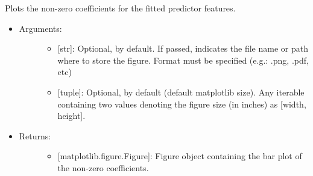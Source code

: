 \documentclass[letterpaper,10pt,english]{sphinxmanual}
\begin{document}
\begin{fulllineitems}

\begin{fulllineitems}
\label{\detokenize{models:data_tools.models.Lasso.plot_coef}}
Plots the non-zero coefficients for the fitted predictor
features.
\begin{itemize}
\item {} \begin{description}
\item[{Arguments:}] \leavevmode\begin{itemize}
\item {} 
 {[}str{]}: Optional,  by default. If
passed, indicates the file name or path where to store the
figure. Format must be specified (e.g.: .png, .pdf, etc)

\item {} 
 {[}tuple{]}: Optional,  by default (default
matplotlib size). Any iterable containing two values
denoting the figure size (in inches) as {[}width, height{]}.

\end{itemize}

\end{description}

\item {} \begin{description}
\item[{Returns:}] \leavevmode\begin{itemize}
\item {} 
{[}matplotlib.figure.Figure{]}: Figure object containing the
bar plot of the non-zero coefficients.

\end{itemize}

\end{description}

\end{itemize}

\end{fulllineitems}



\end{fulllineitems}
\end{document}
